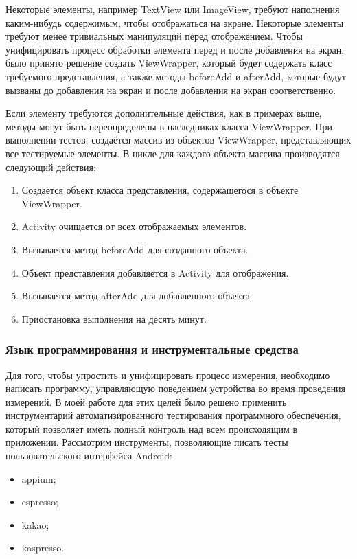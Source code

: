 \documentclass[a4paper,14pt]{extarticle} %
\begin{document}
	Некоторые элементы, например TextView или ImageView, требуют наполнения каким-нибудь содержимым, чтобы отображаться на экране. Некоторые элементы требуют менее тривиальных манипуляций перед отображением. Чтобы унифицировать процесс обработки элемента перед и после добавления на экран, было принято решение создать ViewWrapper, который будет содержать класс требуемого представления, а также методы beforeAdd и afterAdd, которые будут вызваны до добавления на экран и после добавления на экран соответственно. 
	
	Если элементу требуются дополнительные действия, как в примерах выше, методы могут быть переопределены в наследниках класса ViewWrapper. При выполнении тестов, создаётся массив из объектов ViewWrapper, представляющих все тестируемые элементы. В цикле для каждого объекта массива производятся следующий действия:
	\begin{enumerate}
		\item Создаётся объект класса представления, содержащегося в объекте ViewWrapper.
		\item Activity очищается от всех отображаемых элементов.
		\item Вызывается метод beforeAdd для созданного объекта.
		\item Объект представления добавляется в Activity для отображения.
		\item Вызывается метод afterAdd для добавленного объекта.
		\item Приостановка выполнения на десять минут.
	\end{enumerate}
	
	\subsubsection{Язык программирования и  инструментальные средства}
	
	Для того, чтобы упростить и унифицировать процесс измерения, необходимо написать программу, управляющую поведением устройства во время проведения измерений. В моей работе для этих целей было решено применить инструментарий автоматизированного тестирования программного обеспечения, который позволяет иметь полный контроль над всем происходящим в приложении. Рассмотрим инструменты, позволяющие писать тесты пользовательского интерфейса Android:
	\begin{itemize}
		\item appium;
		\item espresso;
		\item kakao;
		\item kaspresso.
	\end{itemize}
	
\end{document}
